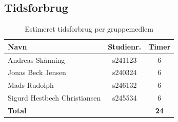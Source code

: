 \documentclass{article}
\begin{document}
\subsection*{Tidsforbrug}

\begin{table}[H]
    \centering
    \begin{tabular}{l|c|c}
        \textbf{Navn} & \textbf{Studienr.} & \textbf{Timer} \\
        \hline
        Andreas Sk\aa nning           & s241123 & 6\\
        Jonas Beck Jensen             & s240324 & 6 \\
        Mads Rudolph                  & s246132 & 6 \\
        Sigurd Hestbech Christiansen  & s245534 & 6 \\
        \hline
        \textbf{Total}                &         & \textbf{24}\\
    \end{tabular}
    \caption{Estimeret tidsforbrug per gruppemedlem}
    \label{tab:tidsforbrug}
\end{table}
\end{document}
